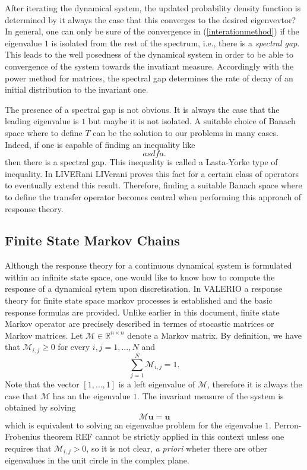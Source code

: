 After iterating the dynamical system, the updated probability density function is determined by  it always the case that this converges to the desired eigenvevtor? In general, one can only be sure of the convergence in (\ref{interationmethod}) if the eigenvalue $1$ is isolated from the rest of the spectrum, i.e., there is a \emph{spectral gap}. This leads to the well posedness of the dynamical system in order to be able to convergence of the system towards the invatiant measure. Accordingly with the power method for matrices, the spectral gap determines the rate of decay of an initial distribution to the invariant one.

The presence of a spectral gap is not obvious. It is always the case that the leading eigenvalue is $1$ but maybe it is not isolated. A suitable choice of Banach space where to define $T$ can be the solution to our problems in many cases. Indeed, if one is capable of finding an inequality like
\begin{equation}\label{lasotayorke}
	asdfa.
\end{equation}
then there is a spectral gap. This inequality is called a Lasta-Yorke type of inequality. In LIVERani LIVerani proves this fact for a certain class of operators to eventually extend this result. Therefore, finding a suitable Banach space where to define the transfer operator becomes central when performing this approach of response theory.

\subsection*{Finite State Markov Chains}

Although the response theory for a continuous dynamical system is formulated within an infinite state space, one would like to know how to compute the response of a dynamical sytem upon discretisation. In VALERIO a response theory for finite state space markov processes is established and the basic response formulas are provided. Unlike earlier in this document, finite state Markov operator are precisely described in termes of stocastic matrices or Markov matrices. Let $\mathcal{M}\in \mathbb{R}^{n \times n}$ denote a Markov matrix. By definition, we have that $\mathcal{M}_{i,j}\geq 0$ for every $i,j=1,\ldots,N$ and
\begin{equation}
	\sum _{j=1}^{N}\mathcal{M}_{i,j}=1.
\end{equation}
Note that the vector $[1,\ldots , 1]$ is a left eigenvalue of $\mathcal{M}$, therefore it is always the case that $\mathcal{M}$ has an the eigenvalue $1$. The invariant measure of the system is obtained by solving
\begin{equation}\label{eq3}
	\mathcal{M}\mathbf{u}=\mathbf{u}
\end{equation}
which is equivalent to solving an eigenvalue problem for the eigenvalue $1$. Perron-Frobenius theorem REF cannot be strictly applied in this context unless one requires that $\mathcal{M}_{i,j}> 0$, so it is not clear, \emph{a priori} wheter there are other eigenvalues in the unit circle in the complex plane. 

